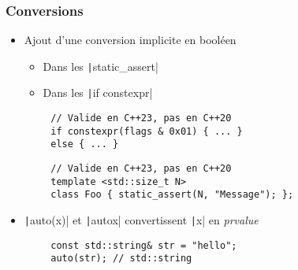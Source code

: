 \documentclass[C++.tex]{subfiles}
\begin{document}
\begin{frame}[fragile]
	\frametitle{Conversions}
	\begin{itemize}
		\item Ajout d'une conversion implicite en booléen
		\begin{itemize}
			\item Dans les \texttt|static_assert|
			\item Dans les \texttt|if constexpr|
		\end{itemize}
	\end{itemize}

	\begin{verbatim}
		// Valide en C++23, pas en C++20
		if constexpr(flags & 0x01) { ... }
		else { ... }
	\end{verbatim}

	\begin{verbatim}
		// Valide en C++23, pas en C++20
		template <std::size_t N>
		class Foo { static_assert(N, "Message"); };
	\end{verbatim}

	\begin{itemize}
		\item \texttt|auto(x)| et \texttt|auto{x}| convertissent \texttt|x| en \textit{prvalue}

	\end{itemize}

	\begin{verbatim}
		const std::string& str = "hello";
		auto(str); // std::string
	\end{verbatim}

\end{frame}
\end{document}
